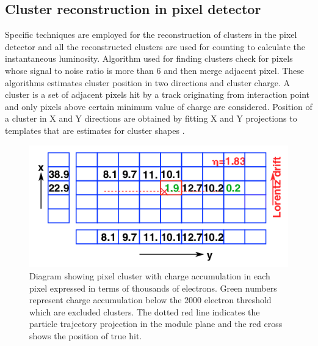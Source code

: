 \subsection{Cluster reconstruction in pixel detector}
Specific techniques are employed for the reconstruction of clusters in the pixel detector and all the reconstructed clusters are used for counting to calculate the instantaneous luminosity. Algorithm used for finding clusters check for pixels whose signal to noise ratio is more than 6 and then merge adjacent pixel. These algorithms estimates cluster position in two directions and cluster charge. A cluster is a set of adjacent pixels hit by a track originating from interaction point and only pixels above certain minimum value of charge are considered. Position of a cluster in X and Y directions are obtained by fitting X and Y projections to templates that are estimates for cluster shapes \cite{Chatrchyan:2014fea}. \\


\begin{figure}[H]
  \centering
  \includegraphics[width=0.6\columnwidth]{./pixel_reco.png}
  \caption{ \onehalfspacing Diagram showing pixel cluster with charge accumulation in each pixel expressed in terms of thousands of electrons. Green numbers represent charge accumulation below the 2000 electron threshold which are excluded clusters. The dotted red line indicates the particle trajectory projection in the module plane and the red cross shows the position of true hit.}
  \label{fig:CMS}
\end{figure}


\clearpage\newpage
